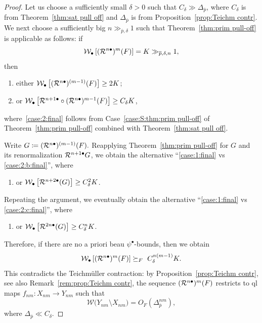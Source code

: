 \documentclass{amsart}
\newcommand{\1}{{\mathbb 1 }}
\newcommand{\Width}{{\mathcal W}}
\begin{document}
\begin{proof}
Let us choose a sufficiently small $\delta>0$ such that  $C_\delta\gg \Delta_{\overline p}$,
where
 $C_\delta$ is from Theorem~\ref{thm:sat pull off} and $\Delta_{\overline p}$ is from Proposition~\ref{prop:Teichm contr}. We next choose a sufficiently big $n\gg _{\overline p, \delta} 1$ such that Theorem~\ref{thm:prim pull-off} is applicable as follows: if 
 \[\Width_\bullet \left[ (\RR^{n\bullet})^m (F)\right] = K \gg_{\overline p, \delta, n} 1,\]
 then 
\begin{enumerate}[label=\text{(\Roman*)},font=\normalfont,leftmargin=*]
\item\label{case:1:final}  either $\Width_\bullet \left[ (\RR^{n\bullet})^{(m-1)} (F)\right] \ge 2 K$; 
\item\label{case:2:final} or $\Width_\bullet \left[ \RR^{n+1\bullet} \circ (\RR^{n\bullet})^{m-1} (F)\right] \ge C_\delta K$,
\end{enumerate}
where~\ref{case:2:final} follows from Case~\ref{case:S:thm:prim pull-off} of Theorem~\ref{thm:prim pull-off} combined with Theorem~\ref{thm:sat pull off}. 

Write $G\coloneqq ({\mathcal R}^{n\bullet})^{(m-1)} (F).$ Reapplying Theorem~\ref{thm:prim pull-off} for $G$ and its renormalization ${\mathcal R}^{n+1 \bullet }G$, we obtain the alternative ``\ref{case:1:final} vs \ref{case:2:b:final}'', where
\begin{enumerate}[label=\text{(\Roman*')},font=\normalfont,start=2, leftmargin=*]
\item\label{case:2:b:final} or $\Width_\bullet \left[ \RR^{n+2\bullet} (G)\right] \ge C^2_\delta K$.
\end{enumerate}
Repeating the argument, we eventually obtain the alternative ``\ref{case:1:final} vs \ref{case:2:c:final}'', where
 \begin{enumerate}[label=\text{(\Roman*'')},font=\normalfont,start=2, leftmargin=*]
\item\label{case:2:c:final} or $\Width_\bullet \left[ \RR^{2n\bullet} (G)\right] \ge C^n_\delta K$.
\end{enumerate}

Therefore, if there are no a priori beau $\psi^\bullet$-bounds, then we obtain
\[\Width_\bullet \left[ (\RR^{n\bullet})^{m} (F)\right]  \succeq_F \ C^{n(m-1)}_\delta K.\]
This contradicts the Teichm\"uller contraction: by Proposition~\ref{prop:Teichm contr}, see also Remark~\ref{rem:prop:Teichm contr}, the sequence $({\mathcal R}^{n\bullet})^m (F)$ restricts to ql maps $f_{nm}:X_{nm}\to Y_{nm}$ such that  
\[ \Width\big(Y_{nm}\setminus X_{nm}\big) =O_F(\Delta_{\overline p}^{nm}) ,\]
where $\Delta_{\overline p}\ll C_\delta.$
\end{proof}
\end{document}
